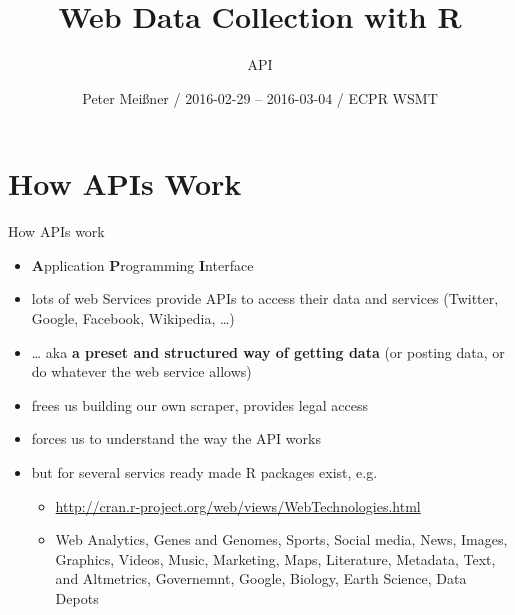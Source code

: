 \documentclass[ignorenonframetext,]{beamer}
\title{Web Data Collection with R}
\subtitle{API}
\author{Peter Meißner / 2016-02-29 -- 2016-03-04 / ECPR WSMT}
\date{}
\providecommand{\tightlist}{%
  \setlength{\itemsep}{0pt}\setlength{\parskip}{0pt}}
\begin{document}
\frame{\titlepage}

\begin{frame}
\tableofcontents[hideallsubsections]
\end{frame}

\section{How APIs Work}\label{how-apis-work}

\begin{frame}{How APIs work}

\begin{itemize}
\tightlist
\item
  \textbf{A}pplication \textbf{P}rogramming \textbf{I}nterface
\item
  lots of web Services provide APIs to access their data and services
  (Twitter, Google, Facebook, Wikipedia, \ldots{})
\item
  \ldots{} aka \textbf{a preset and structured way of getting data} (or
  posting data, or do whatever the web service allows)
\item
  frees us building our own scraper, provides legal access
\item
  forces us to understand the way the API works
\item
  but for several servics ready made R packages exist, e.g.

  \begin{itemize}
  \tightlist
  \item
    \url{http://cran.r-project.org/web/views/WebTechnologies.html}
  \item
    Web Analytics, Genes and Genomes, Sports, Social media, News,
    Images, Graphics, Videos, Music, Marketing, Maps, Literature,
    Metadata, Text, and Altmetrics, Governemnt, Google, Biology, Earth
    Science, Data Depots
  \end{itemize}
\end{itemize}

\end{frame}
\end{document}
